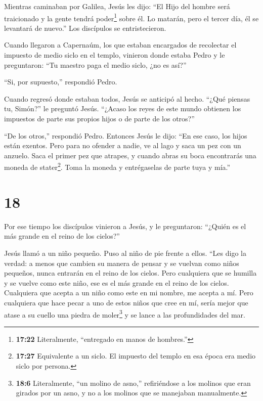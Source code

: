  Mientras caminaban por Galilea, Jesús les dijo: ``El Hijo
del hombre será traicionado y la gente tendrá poder\footnote{\textbf{17:22}
  Literalmente, ``entregado en manos de hombres.''} sobre él.
 Lo matarán, pero el tercer día, él se levantará de
nuevo.'' Los discípulos se entristecieron.

 Cuando llegaron a Capernaúm, los que estaban encargados de
recolectar el impuesto de medio siclo en el templo, vinieron donde
estaba Pedro y le preguntaron: ``Tu maestro paga el medio siclo, ¿no es
así?''

 ``Si, por supuesto,'' respondió Pedro.

Cuando regresó donde estaban todos, Jesús se anticipó al hecho. ``¿Qué
piensas tu, Simón?'' le preguntó Jesús. ``¿Acaso los reyes de este mundo
obtienen los impuestos de parte sus propios hijos o de parte de los
otros?''

 ``De los otros,'' respondió Pedro. Entonces Jesús le dijo:
``En ese caso, los hijos están exentos.  Pero para no
ofender a nadie, ve al lago y saca un pez con un anzuelo. Saca el primer
pez que atrapes, y cuando abras su boca encontrarás una moneda de
stater\footnote{\textbf{17:27} Equivalente a un siclo. El impuesto del
  templo en esa época era medio siclo por persona.}. Toma la moneda y
entrégaselas de parte tuya y mía.''

\hypertarget{section-17}{%
\section{18}\label{section-17}}

 Por ese tiempo los discípulos vinieron a Jesús, y le
preguntaron: ``¿Quién es el más grande en el reino de los cielos?''

 Jesús llamó a un niño pequeño. Puso al niño de pie frente a
ellos.  ``Les digo la verdad: a menos que cambien su manera
de pensar y se vuelvan como niños pequeños, nunca entrarán en el reino
de los cielos.  Pero cualquiera que se humilla y se vuelve
como este niño, ese es el más grande en el reino de los cielos.
 Cualquiera que acepta a un niño como este en mi nombre, me
acepta a mí.  Pero cualquiera que hace pecar a uno de estos
niños que cree en mí, sería mejor que atase a su cuello una piedra de
moler\footnote{\textbf{18:6} Literalmente, ``un molino de asno,''
  refiriéndose a los molinos que eran girados por un asno, y no a los
  molinos que se manejaban manualmente.} y se lance a las profundidades
del mar.

